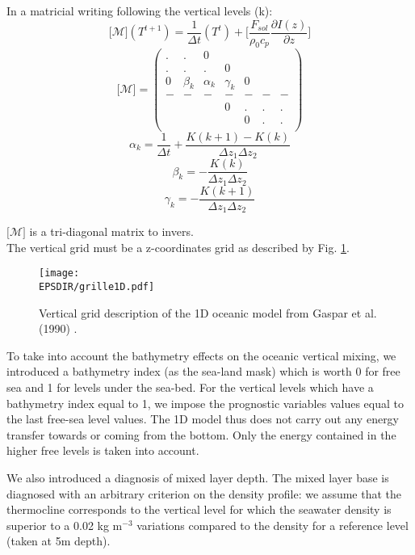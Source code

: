 In a matricial writing following the vertical levels (k):
\begin{equation}
\lbrack\mathcal{M}\rbrack\left(T^{t+1}\right)=\frac{1}{\Delta t}\left(T^{t}\right)+\lbrack\frac{F_{sol}}{\rho_{0}c_{p}}\frac{\partial I(z)}{\partial z}\rbrack
\end{equation}
\begin{equation}
\lbrack\mathcal{M}\rbrack=\left(
\begin{array}{ccccccc}
. & . & 0 & & & & \\
. & . & . & 0 & & & \\
0 & \beta_{k} & \alpha_{k} & \gamma_{k} & 0 & &\\
- & - & - & - & - & - & - \\
 & & & 0 & . & . & .\\
 & & & & 0 & . & .\\
\end{array}
\right)
\end{equation}
$$\alpha_{k}=\frac{1}{\Delta t}+\frac{K(k+1)-K(k)}{\Delta z_{1}\Delta z_{2}}$$
$$\beta_{k}=-\frac{K(k)}{\Delta z_{1}\Delta z_{2}}$$
$$\gamma_{k}=-\frac{K(k+1)}{\Delta z_{1}\Delta z_{2}}$$

$\lbrack\mathcal{M}\rbrack$ is a tri-diagonal matrix to invers. \\

The vertical grid must be a z-coordinates grid as described by Fig. \ref{grille1}. 
\begin{figure}[!h]
\centering\texttt{[image: \\EPSDIR/grille1D.pdf]}
\caption{Vertical grid description of the 1D oceanic model from Gaspar et al. (1990) %
.  \label{grille1}}
\end{figure}

To take into account the bathymetry effects on the oceanic vertical mixing, we introduced a bathymetry index (as the sea-land mask) which is worth 0 for free sea and 1 for levels under the sea-bed. For the vertical levels which have a bathymetry index equal to 1, we impose the prognostic variables values equal to the last free-sea level values. The 1D model thus does not carry out any energy transfer towards or coming from the bottom. Only the energy contained in the higher free levels is taken into account. 

We also introduced a diagnosis of mixed layer depth. The mixed layer base is diagnosed with an arbitrary criterion on the density profile: we assume that the thermocline corresponds to the vertical level for which the seawater density is superior to a 0.02 kg m$^{-3}$ variations compared to the density for a reference level (taken at 5m depth).  

